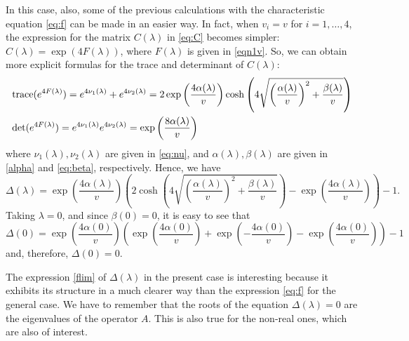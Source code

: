 \documentclass[a4paper]{article}
\numberwithin{equation}{section}
\begin{document}
In this case, also, some of the previous calculations with the characteristic equation \eqref{eq:f} can be made in an easier way.
In fact, when $v_i=v$ for $i=1,\ldots,4$, the expression for the matrix $C(\lambda)$ in \eqref{eq:C} becomes simpler: $C(\lambda)=\exp(4F(\lambda))$, where $F(\lambda)$ is given in \eqref{eqn1v}. So, we can obtain more explicit formulas for the trace and determinant of $C(\lambda)$:
\begin{align*}
&{\rm trace}(e^{4F(\lambda)})  = e^{4\nu_1(\lambda)}+e^{4\nu_2(\lambda)}
                       = 2\exp\left( \dfrac{4\alpha(\lambda)}{v}\right)\cosh\left(4\sqrt{\left(\dfrac{\alpha(\lambda)}{v}\right)^2+\dfrac{\beta(\lambda)}{v}}\right)\\
&{\rm det}(e^{4F(\lambda)}) = e^{4\nu_1(\lambda)}e^{4\nu_2(\lambda)}
                     = \exp\left(\frac{8\alpha(\lambda)}{v}\right)
\end{align*}
where $\nu_1(\lambda),\nu_2(\lambda)$ are given in \eqref{eq:nu}, and $\alpha(\lambda),\beta(\lambda)$ are given in \eqref{alpha} and \eqref{eq:beta}, respectively.
Hence, we have
\begin{equation}\label{flim}
\Delta(\lambda)=\exp\left( \dfrac{4\alpha(\lambda)}{v}\right)\left( 2\cosh\left(4\sqrt{\left(\dfrac{\alpha(\lambda)}{v}\right)^2+\dfrac{\beta(\lambda)}{v}}\right)-\exp\left( \dfrac{4\alpha(\lambda)}{v}\right)\right)-1.
\end{equation}
Taking $\lambda=0$, and since $\beta(0)=0$, it is easy to see that
$$\Delta(0)=\exp\left( \dfrac{4\alpha(0)}{v}\right)\left(\exp\left( \dfrac{4\alpha(0)}{v}\right)+\exp\left( -\dfrac{4\alpha(0)}{v}\right)-\exp\left( \dfrac{4\alpha(0)}{v}\right)\right)-1$$
and, therefore, $\Delta(0)=0$.

The expression \eqref{flim} of $\Delta(\lambda)$ in the present case is interesting because it exhibits its structure in a much clearer way than the expression \eqref{eq:f} for the general case. We have to remember that the roots of the equation $\Delta(\lambda)=0$ are the eigenvalues of the operator $A$. This is also true for the non-real ones, which are also of interest.
\end{document}
